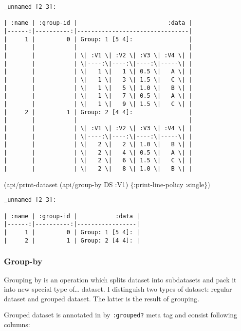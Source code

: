 \documentclass[]{article}
\newenvironment{Shaded}{\begin{snugshade}}{\end{snugshade}}
\newcommand{\AttributeTok}[1]{\textcolor[rgb]{0.77,0.63,0.00}{#1}}
\newcommand{\NormalTok}[1]{#1}
\begin{document}
\begin{verbatim}
_unnamed [2 3]:

| :name | :group-id |                          :data |
|------:|----------:|--------------------------------|
|     1 |         0 | Group: 1 [5 4]:                |
|       |           |                                |
|       |           | \| :V1 \| :V2 \| :V3 \| :V4 \| |
|       |           | \|----:\|----:\|----:\|-----\| |
|       |           | \|   1 \|   1 \| 0.5 \|   A \| |
|       |           | \|   1 \|   3 \| 1.5 \|   C \| |
|       |           | \|   1 \|   5 \| 1.0 \|   B \| |
|       |           | \|   1 \|   7 \| 0.5 \|   A \| |
|       |           | \|   1 \|   9 \| 1.5 \|   C \| |
|     2 |         1 | Group: 2 [4 4]:                |
|       |           |                                |
|       |           | \| :V1 \| :V2 \| :V3 \| :V4 \| |
|       |           | \|----:\|----:\|----:\|-----\| |
|       |           | \|   2 \|   2 \| 1.0 \|   B \| |
|       |           | \|   2 \|   4 \| 0.5 \|   A \| |
|       |           | \|   2 \|   6 \| 1.5 \|   C \| |
|       |           | \|   2 \|   8 \| 1.0 \|   B \| |
\end{verbatim}

\begin{Shaded}
\begin{Highlighting}[]
\NormalTok{(api/print-dataset (api/group-by DS }\AttributeTok{:V1}\NormalTok{) \{}\AttributeTok{:print-line-policy} \AttributeTok{:single}\NormalTok{\})}
\end{Highlighting}
\end{Shaded}

\begin{verbatim}
_unnamed [2 3]:

| :name | :group-id |           :data |
|------:|----------:|-----------------|
|     1 |         0 | Group: 1 [5 4]: |
|     2 |         1 | Group: 2 [4 4]: |
\end{verbatim}

\subsubsection{Group-by}\label{group-by}

Grouping by is an operation which splits dataset into subdatasets and
pack it into new special type of\ldots{} dataset. I distinguish two
types of dataset: regular dataset and grouped dataset. The latter is the
result of grouping.

Grouped dataset is annotated in by \texttt{:grouped?} meta tag and
consist following columns:
\end{document}

